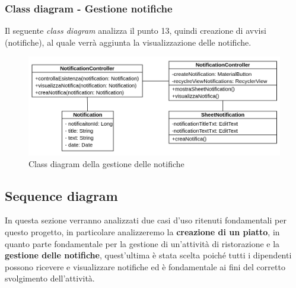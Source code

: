 \subsubsection{Class diagram - Gestione notifiche}
Il seguente \textit{class diagram} analizza il punto 13, quindi creazione di avvisi (notifiche), al quale verrà aggiunta la visualizzazione delle notifiche.
\begin{figure}[H]
  \centering
  \includegraphics[scale=0.5]{img/class_diagrams/gestioneNotifiche_class_diagram.png}
  \caption{Class diagram della gestione delle notifiche}
\end{figure}
\newpage
\subsection{Sequence diagram}
In questa sezione verranno analizzati due casi d'uso ritenuti fondamentali per questo progetto, in particolare analizzeremo la \textbf{creazione di un piatto}, in quanto parte fondamentale per la gestione di un'attività di ristorazione e la \textbf{gestione delle notifiche}, quest'ultima è stata scelta poiché tutti i dipendenti possono ricevere e visualizzare notifiche ed è fondamentale ai fini del corretto svolgimento dell'attività.
